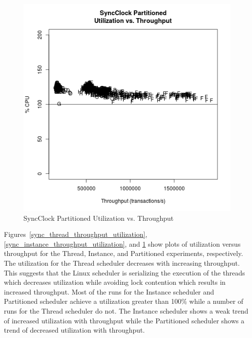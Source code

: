 \begin{figure}[H]
\center
\includegraphics[height=.4\textheight]{sync_partitioned_throughput_utilization.png}
\caption{SyncClock Partitioned Utilization vs. Throughput}
\label{sync_partitioned_throughput_utilization}
\end{figure}

Figures~\ref{sync_thread_throughput_utilization}, \ref{sync_instance_throughput_utilization}, and \ref{sync_partitioned_throughput_utilization} show plots of utilization versus throughput for the Thread, Instance, and Partitioned experiments, respectively.
The utilization for the Thread scheduler decreases with increasing throughput.
This suggests that the Linux scheduler is serializing the execution of the threads which decreases utilization while avoiding lock contention which results in increased throughput.
Most of the runs for the Instance scheduler and Partitioned scheduler achieve a utilization greater than 100\% while a number of runs for the Thread scheduler do not.
The Instance scheduler shows a weak trend of increased utilization with throughput while the Partitioned scheduler shows a trend of decreased utilization with throughput.


